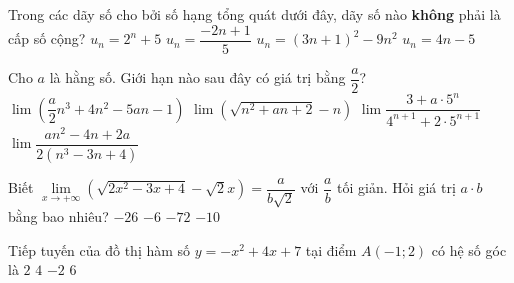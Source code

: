 \begin{ex}%
	Trong các dãy số cho bởi số hạng tổng quát dưới đây, dãy số nào \textbf{không} phải là cấp số cộng?
	\choice
	{\True $u_n=2^n+5$}
	{$u_n=\dfrac{-2n+1}{5}$}
	{$u_n=(3n+1)^2-9n^2$}
	{$u_n=4n-5$}
\end{ex}

\begin{ex}%
	Cho $a$ là hằng số. Giới hạn nào sau đây có giá trị bằng $\dfrac{a}{2}$?
	\choice
	{$\lim\limits\left(\dfrac{a}{2}n^3+4n^2-5an-1\right)$}
	{\True $\lim\limits\left(\sqrt{n^2+an+2}-n\right)$}
	{$\lim\limits\dfrac{3+a\cdot 5^n}{4^{n+1}+2\cdot 5^{n+1}}$}
	{$\lim\limits\dfrac{an^2-4n+2a}{2(n^3-3n+4)}$}
\end{ex}

\begin{ex}%
	Biết $\lim\limits_{x\to +\infty}\left(\sqrt{2x^2-3x+4}-\sqrt{2}x\right)=\dfrac{a}{b\sqrt{2}}$ với $\dfrac{a}{b}$ tối giản. Hỏi giá trị $a\cdot b$ bằng bao nhiêu?
	\choice
	{$-26$}
	{\True $-6$}
	{$-72$}
	{$-10$}
\end{ex}

\begin{ex}%
	Tiếp tuyến của đồ thị hàm số $y=-x^2+4x+7$ tại điểm $A(-1;2)$ có hệ số góc là
	\choice
	{$2$}
	{$4$}
	{$-2$}
	{\True $6$}
\end{ex}

